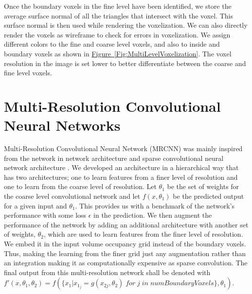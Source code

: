 \documentclass[10pt,letterpaper]{article}
\newcommand{\cref}[2]{\hyperref[#2]{#1~\ref*{#2}}}
\begin{document}
Once the boundary voxels in the fine level have been identified, we store the average surface normal of all the triangles that intersect with the voxel. This surface normal is then used while rendering the voxelization. We can also directly render the voxels as wireframe to check for errors in voxelization. We assign different colors to the fine and coarse level voxels, and also to inside and boundary voxels as shown in \cref{Figure}{Fig:MultiLevelVoxelization}. The voxel resolution in the image is set lower to better differentiate between the coarse and fine level voxels. 



\section{Multi-Resolution Convolutional Neural Networks}
\label{Sec:MRCNN}

Multi-Resolution Convolutional Neural Network (MRCNN) was mainly inspired from the network in network architecture and sparse convolutional neural network architecture . We developed an  architecture in a hierarchical way that has two architectures; one to learn features from a finer level of resolution and one to learn from the coarse level of resolution. Let $\theta_1$ be the set of weights for the coarse level convolutional network and let $f(x,\theta_1)$ be the predicted output for a given input and $\theta_1$. This provides us with a benchmark of the network's performance with some loss $\epsilon$ in the prediction. We then augment the performance of the network by adding an additional architecture with another set of weights, $\theta_2$, which are used to learn features from the finer level of resolution. We embed it in the input volume occupancy grid instead of the boundary voxels. Thus, making the learning from the finer grid just any augmentation rather than an integration making it as computationally expensive as sparse convolution. The final output from this multi-resolution network shall be denoted with $f'(x,\theta_1,\theta_2) = f(\{x_1|x_{1_j} = g(x_{2j},\theta_2) \; for \; j \;in \;numBoundaryVoxels\},\theta_1)$.
\end{document}

